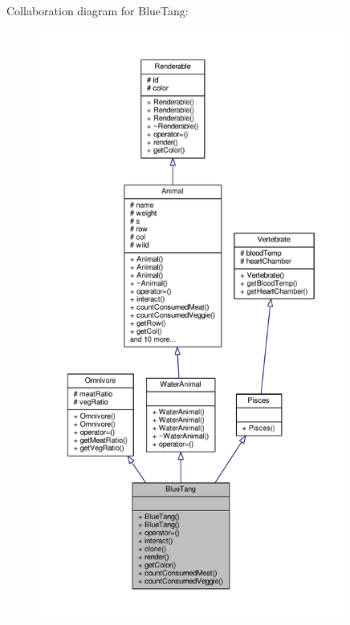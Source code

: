 Collaboration diagram for Blue\+Tang\+:
\nopagebreak
\begin{figure}[H]
\begin{center}
\leavevmode
\includegraphics[height=550pt]{classBlueTang__coll__graph}
\end{center}
\end{figure}
